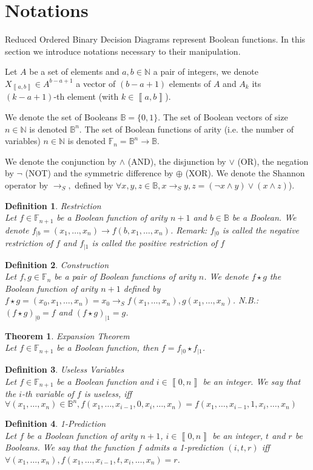 \documentclass[a4paper,10pt]{article}
\newcommand{\shannon}[3]{{#1}\longrightarrow_S{#2}, {#3}}
\newcommand{\N}{\mathbb{N}}%
\newcommand{\B}{\mathbb{B}}
\newcommand{\F}{\mathbb{F}}
\newcommand{\bras}[1]{{\left\llbracket{#1}\right\rrbracket}}
\newcommand\restr[2]{{#1}_{\left|{#2}\right.}}
\newtheorem{newtheo}{Theorem}
\newcommand{\theorem}[2]{\begin{newtheo}{\textsf{#1}\\} #2 \end{newtheo}}
\newtheorem{newdef}{Definition}
\newcommand{\definition}[2]{\begin{newdef}{#1\\}#2\end{newdef}}
\begin{document}
\section{Notations}

Reduced Ordered Binary Decision Diagrams represent Boolean functions.
In this section we introduce notations necessary to their manipulation.

Let $A$ be a set of elements and $a, b\in\N$ a pair of integers, we denote $X_{\bras{a, b}}\in A^{b-a+1}$ a vector of $(b-a+1)$ elements of $A$ and $A_k$ its $(k-a+1)$-th element (with $k\in\bras{a, b}$).

We denote the set of Booleans $\B = \{0, 1\}$.
The set of Boolean vectors of size $n\in\N$ is denoted $\B^n$.
The set of Boolean functions of arity (i.e. the number of variables) $n\in\N$ is denoted $\F_n = \B^n \longrightarrow \B$.


We denote the conjunction by $\land$ (AND), the disjunction by $\lor$ (OR), the negation by $\lnot$ (NOT) and the symmetric difference by $\oplus$ (XOR).
We denote the Shannon operator by $\shannon{}{}{}$ defined by $\forall x, y, z\in\B, \shannon{x}{y}{z} = (\lnot x \land y) \lor (x \land z)$).

\definition{Restriction}
{
	Let $f\in\F_{n+1}$ be a Boolean function of arity $n+1$ and $b\in\B$ be a Boolean.
	We denote $\restr{f}{b} = (x_1, \dots, x_n) \longrightarrow f(b, x_1, \dots, x_n)$.
	Remark: $\restr{f}{0}$ is called the negative restriction of $f$ and $\restr{f}{1}$ is called the positive restriction of $f$
}

\definition{Construction}
{
	Let $f, g\in\F_n$ be a pair of Boolean functions of arity $n$.
	We denote $f\star{}g$ the Boolean function of arity $n+1$ defined by $ f\star{}g = (x_0, x_1, \dots, x_n) = \shannon{x_0}{f(x_1, \dots, x_n)}{g(x_1, \dots, x_n)}$.
	N.B.: $\restr{(f\star g)}{0} = f$ and $ \restr{(f\star g)}{1} = g$.
}

\theorem{Expansion Theorem}{
Let $f\in\F_{n+1}$ be a Boolean function, then $f = \restr{f}{0} \star \restr{f}{1}$.
}

\definition{Useless Variables}
{
Let $f\in\F_{n+1}$ be a Boolean function and $i\in\bras{0, n}$ be an integer.
We say that the $i$-th variable of $f$ is useless, iff $\forall (x_1, \dots, x_n)\in\B^n, f(x_1, \dots, x_{i-1}, 0, x_i, \dots, x_n) = f(x_1, \dots, x_{i-1}, 1, x_i, \dots, x_n)$
}

\definition{1-Prediction}
{
Let $f$ be a Boolean function of arity $n+1$, $i\in\bras{0, n}$ be an integer, $t$ and $r$ be Booleans.
We say that the function $f$ admits a 1-prediction $(i, t, r)$ iff $\forall (x_1, \dots, x_n), f(x_1, \dots, x_{i-1}, t, x_i, \dots, x_n) = r$.
}
\end{document}
